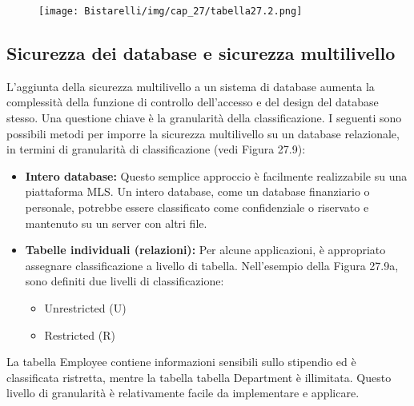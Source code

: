 \begin{figure}[H]
	\centering
    \texttt{[image: Bistarelli/img/cap\_27/tabella27.2.png]}
\end{figure}


\subsection{Sicurezza dei database e sicurezza multilivello}

L'aggiunta della sicurezza multilivello a un sistema di database aumenta la complessità della funzione di controllo dell'accesso e del design del database stesso. Una questione chiave è la granularità della classificazione. I seguenti sono possibili metodi per imporre la sicurezza multilivello su un database relazionale, in termini di granularità di classificazione (vedi Figura 27.9):
\begin{itemize}
    \item \textbf{Intero database:} Questo semplice approccio è facilmente realizzabile su una piattaforma MLS. Un intero database, come un database finanziario o personale, potrebbe essere classificato come confidenziale o riservato e mantenuto su un server con altri file.
    
    \item \textbf{Tabelle individuali (relazioni):} Per alcune applicazioni, è appropriato assegnare classificazione a livello di tabella. Nell'esempio della Figura 27.9a, sono definiti due livelli di classificazione:
    \begin{itemize}
        \item Unrestricted (U)
        \item Restricted (R)
    \end{itemize}
\end{itemize}

La tabella Employee contiene informazioni sensibili sullo stipendio ed è classificata ristretta, mentre la tabella tabella Department è illimitata. Questo livello di granularità è relativamente facile da implementare e applicare.

